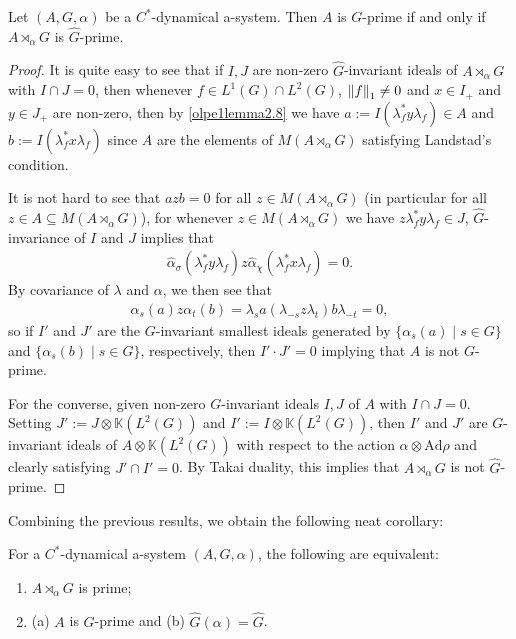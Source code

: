 \begin{lemma}
	Let $(A, G, \alpha)$ be a $C^*$-dynamical a-system. Then $A$ is $G$-prime if and only if $A \rtimes_\alpha G$ is $\hat G$-prime.			
	\label{olpe1.5.7}
\end{lemma}
\begin{proof}
	It is quite easy to see that if $I,J$ are non-zero $\hat G$-invariant ideals of $A \rtimes_\alpha G$ with $I \cap J = 0$, then whenever $f \in L^1(G) \cap L^2(G)$, $\left\lVert f \right\rVert_1  \neq 0$ and $x \in I_+$ and $y \in J_+$ are non-zero, then by \cref{olpe1lemma2.8} we have $a := I(\lambda_f^* y \lambda_f) \in A$ and $b := I(\lambda_f^* x \lambda_f)$ since $A$ are the elements of $M(A \rtimes_\alpha G)$ satisfying Landstad's condition.
	
	It is not hard to see that $a z b = 0$ for all $z \in M(A \rtimes_\alpha G)$ (in particular for all $z \in A \subseteq M(A \rtimes_\alpha G)$), for whenever $z \in M(A \rtimes_\alpha G)$ we have $z \lambda_f^* y \lambda_f \in J$, $\hat G$-invariance of $I$ and $J$ implies that
	\begin{align*}
		\hat \alpha_{\sigma}(\lambda_f^* y \lambda_f) z \hat \alpha_{\chi}(\lambda_f^* x \lambda_f) = 0.
	\end{align*}	
By covariance of $\lambda$ and $\alpha$, we then see that
	\begin{align*}
		\alpha_s(a) z \alpha_t(b) = \lambda_s a (\lambda_{-s} z \lambda_t) b \lambda_{-t}=0,
	\end{align*}
	so if $I'$ and $J'$ are the $G$-invariant smallest ideals generated by $\{ \alpha_s(a) \mid s \in G\}$ and $\{ \alpha_s(b) \mid s \in G\}$, respectively, then $I'\cdot J' = 0$ implying that $A$ is not $G$-prime.

	For the converse, given non-zero $G$-invariant ideals $I,J$ of $A$ with $I \cap J = 0$. Setting $J':=J \otimes \mathbb{K}(L^2(G))$ and $I':=I \otimes \mathbb{K}(L^2(G))$, then $I'$ and $J'$ are $G$-invariant ideals of $A \otimes \mathbb{K}(L^2(G))$ with respect to the action $\alpha \otimes \mathrm{Ad} \rho$ and clearly satisfying $ J'\cap I' = 0$. By Takai duality, this implies that $A \rtimes_\alpha G$ is not $\hat G$-prime. 
\end{proof}
Combining the previous results, we obtain the following neat corollary:
\begin{corollary}
	For a $C^*$-dynamical a-system $(A,G,\alpha)$, the following are equivalent:
	\begin{enumerate}[nosep]
		\item $A \rtimes_\alpha G$ is prime;
		\item (a) $A$ is $G$-prime and (b) $\hat G(\alpha) = \hat G$.
	\end{enumerate}
	\label{olpe1.5.8}
\end{corollary}

